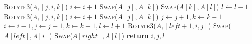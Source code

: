 \documentclass{article}
\begin{document}
\begin{algorithm}[H]
\begin{algorithmic}[1]
                 
                        \State \textsc{Rotate3}($A, [j, i, k]$)
                        \State $i \gets i + 1$
                    \Else
                        \State \textsc{Swap}($A[j], A[k]$) 
                    \EndIf
                    \State \textsc{Swap}($A[k], A[l]$)
                    \State $l \gets l - 1$
                \Else {}
                        \State \textsc{Rotate3}($A, [j, i, k]$)
                        \State $i \gets i + 1$
                    \Else
                        \State \textsc{Swap}($A[j], A[k]$)
                    \EndIf
                \EndIf
                \State $j \gets j + 1, k \gets k - 1$
            \EndIf
        \EndWhile
        \State $i \gets i - 1, j \gets j - 1, k \gets k + 1, l \gets l + 1$
        \State \textsc{Rotate3}($A, [left + 1, i, j]$)
        \State \textsc{Swap}($A[left], A[i]$)
        \State \textsc{Swap}($A[right], A[l]$)
        \State \textbf{return} $i, j, l$
        \EndProcedure
    \end{algorithmic}
\end{algorithm}
\end{document}
